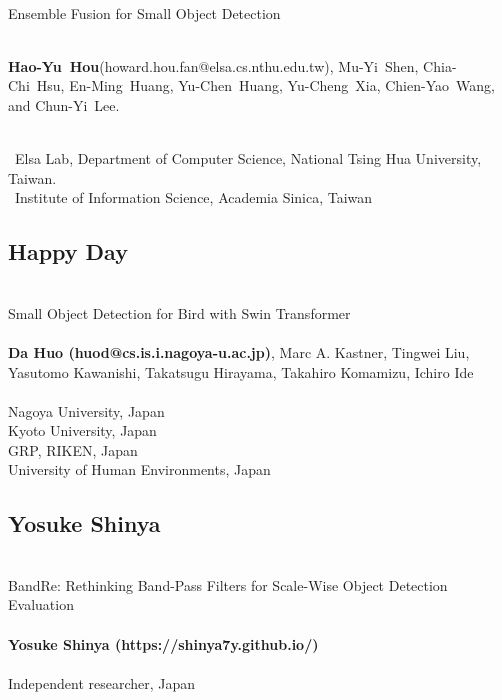 \documentclass{mva_style}
\begin{document}
\\Ensemble Fusion for Small Object Detection

\\\textbf{Hao-Yu~Hou}\footnotemark[1]\newline(howard.hou.fan@elsa.cs.nthu.edu.tw),
{Mu-Yi~Shen}\footnotemark[1],
{Chia-Chi~Hsu}\footnotemark[1],
{En-Ming~Huang}\footnotemark[1],
{Yu-Chen~Huang}\footnotemark[1],
{Yu-Cheng~Xia}\footnotemark[1],
Chien-Yao~Wang\footnotemark[2], and
Chun-Yi~Lee\footnotemark[1].

\\
\noindent\footnotemark[1]~Elsa Lab, Department of Computer Science, National Tsing Hua University, Taiwan.\\
\noindent\footnotemark[2]~Institute of Information Science, Academia Sinica, Taiwan

\subsection*{Happy Day}
\\Small Object Detection for Bird with Swin Transformer\\
\\ \textbf{Da Huo (huod@cs.is.i.nagoya-u.ac.jp)}, Marc A. Kastner, Tingwei Liu, Yasutomo Kawanishi, Takatsugu Hirayama, Takahiro Komamizu, Ichiro Ide\\
\\
 Nagoya University, Japan\\
 Kyoto University, Japan\\
 GRP, RIKEN, Japan\\
 University of Human Environments, Japan\\

\subsection*{Yosuke Shinya}
\\ BandRe: Rethinking Band-Pass Filters for Scale-Wise Object Detection Evaluation\\
\\ \textbf{Yosuke Shinya (https://shinya7y.github.io/)}\\
\\
 Independent researcher, Japan\\
\end{document}
